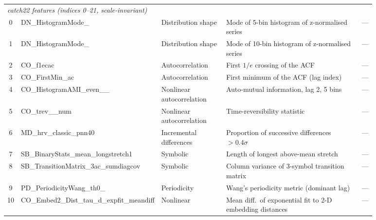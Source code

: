 {\begin{longtable}{@{}c
  >{\ttfamily\raggedright\arraybackslash}p{0.30\linewidth}
  >{\raggedright\arraybackslash}p{0.18\linewidth}
  >{\raggedright\arraybackslash}p{0.40\linewidth}
  c@{}}
\multicolumn{5}{l}{\textit{catch22 features (indices 0--21, scale-invariant)}} \\[2pt]
 0 & DN\_\allowbreak HistogramMode\_\allowbreak 5                          & Distribution shape         & Mode of 5-bin histogram of z-normalised series               & ---           \\
 1 & DN\_\allowbreak HistogramMode\_\allowbreak 10                         & Distribution shape         & Mode of 10-bin histogram of z-normalised series              & ---           \\
 2 & CO\_\allowbreak f1ecac                                    & Autocorrelation            & First $1/e$ crossing of the ACF                              & ---           \\
 3 & CO\_\allowbreak FirstMin\_\allowbreak ac                              & Autocorrelation            & First minimum of the ACF (lag index)                         & ---           \\
 4 & CO\_\allowbreak HistogramAMI\_\allowbreak even\_\allowbreak 2\_\allowbreak 5                  & Nonlinear autocorrelation  & Auto-mutual information, lag 2, 5 bins                       & ---           \\
 5 & CO\_\allowbreak trev\_\allowbreak 1\_\allowbreak num                              & Nonlinear autocorrelation  & Time-reversibility statistic                                 & ---           \\
 6 & MD\_\allowbreak hrv\_\allowbreak classic\_\allowbreak pnn40                       & Incremental differences    & Proportion of successive differences $>{0.4}\sigma$          & ---           \\
 7 & SB\_\allowbreak BinaryStats\_\allowbreak mean\_\allowbreak longstretch1           & Symbolic                   & Length of longest above-mean stretch                         & ---           \\
 8 & SB\_\allowbreak TransitionMatrix\_\allowbreak 3ac\_\allowbreak sumdiagcov         & Symbolic                   & Column variance of 3-symbol transition matrix                & ---           \\
 9 & PD\_\allowbreak PeriodicityWang\_\allowbreak th0\_\allowbreak 01                  & Periodicity                & Wang's periodicity metric (dominant lag)                     & ---           \\
10 & CO\_\allowbreak Embed2\_\allowbreak Dist\_\allowbreak tau\_\allowbreak d\_\allowbreak expfit\_\allowbreak meandiff    & Nonlinear                  & Mean diff.\ of exponential fit to 2-D embedding distances    & ---           \\

\end{longtable}}

